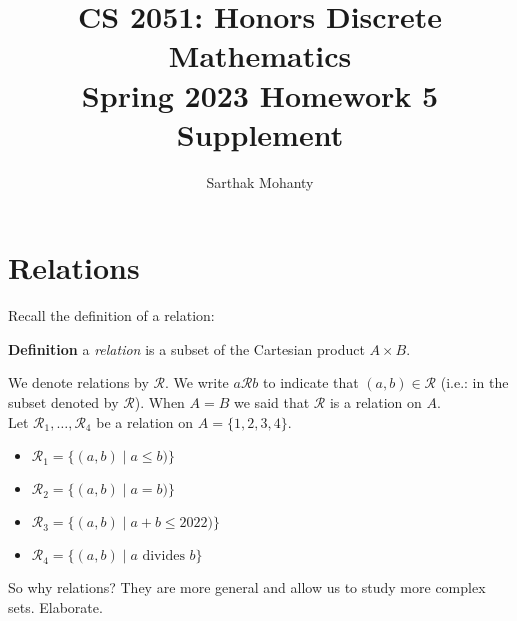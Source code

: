 \documentclass{article}
\title{\vspace{-1cm}CS 2051: Honors Discrete Mathematics \\Spring 2023 Homework 5 Supplement}
\author{Sarthak Mohanty }
\date{}
\begin{document}
\maketitle

\section*{Relations}

    Recall the definition of a relation:
    
    \vspace{1.5mm}
    \textbf{Definition} a \textit{relation} is a subset of the Cartesian product $A\times B$.
    
    \vspace{1.5mm}
    We denote relations by $\mathcal{R}$. We write $a\mathcal{R} b$ to indicate that $(a,b)\in \mathcal{R}$ (i.e.: in the subset denoted by $\mathcal{R}$). When $A=B$ we said that $\mathcal{R}$ is a relation on $A$.\\
    
    Let $\mathcal{R}_1, \dots, \mathcal{R}_4$ be a relation on $A = \{1, 2, 3, 4\}$.
    \begin{itemize}
        \item $\mathcal{R}_1 = \{(a, b) \mid a \le b)\}$
        \item $\mathcal{R}_2 = \{(a, b) \mid a = b)\}$
        \item $\mathcal{R}_3 = \{(a, b) \mid a+b \le 2022)\}$
        \item $\mathcal{R}_4 = \{(a, b) \mid a \text{ divides } b\}$
    \end{itemize}
    
    
    
    So why relations? They are more general and allow us to study more complex sets. Elaborate. \\
    
\end{document}
